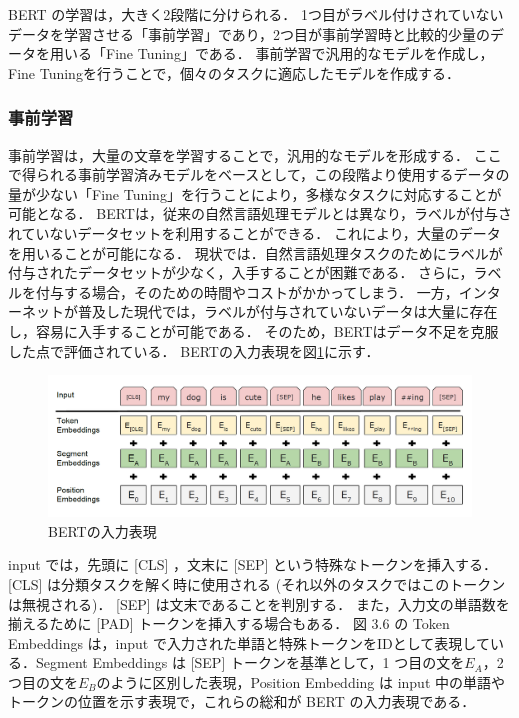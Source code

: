 BERT の学習は，大きく2段階に分けられる．
1つ目がラベル付けされていないデータを学習させる「事前学習」であり，2つ目が事前学習時と比較的少量のデータを用いる「Fine Tuning」である．
事前学習で汎用的なモデルを作成し，Fine Tuningを行うことで，個々のタスクに適応したモデルを作成する．

\subsubsection{事前学習}
事前学習は，大量の文章を学習することで，汎用的なモデルを形成する．
ここで得られる事前学習済みモデルをベースとして，この段階より使用するデータの量が少ない「Fine Tuning」を行うことにより，多様なタスクに対応することが可能となる．
BERTは，従来の自然言語処理モデルとは異なり，ラベルが付与されていないデータセットを利用することができる．
これにより，大量のデータを用いることが可能になる．
現状では．自然言語処理タスクのためにラベルが付与されたデータセットが少なく，入手することが困難である．
さらに，ラベルを付与する場合，そのための時間やコストがかかってしまう．
一方，インターネットが普及した現代では，ラベルが付与されていないデータは大量に存在し，容易に入手することが可能である．
そのため，BERTはデータ不足を克服した点で評価されている．
BERTの入力表現を図\ref{input}に示す．

\begin{figure}[H]
	\centering
	\includegraphics[width=150mm]{image/BERT-input.png}
	\caption{BERTの入力表現}
	\label{input}
\end{figure}

input では，先頭に [CLS] ，文末に [SEP] という特殊なトークンを挿入する．
[CLS] は分類タスクを解く時に使用される (それ以外のタスクではこのトークンは無視される)．
[SEP] は文末であることを判別する．
また，入力文の単語数を揃えるために [PAD] トークンを挿入する場合もある．
図 3.6 の Token Embeddings は，input で入力された単語と特殊トークンをIDとして表現している．Segment Embeddings は [SEP] トークンを基準として，1 つ目の文を${E_A}$，2 つ目の文を${E_B}$のように区別した表現，Position Embedding は input 中の単語やトークンの位置を示す表現で，これらの総和が  BERT の入力表現である．

